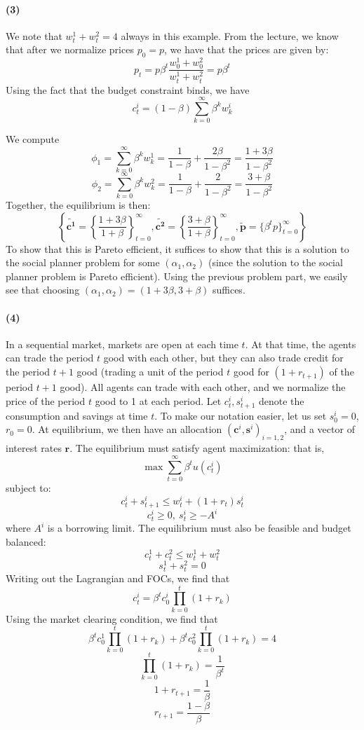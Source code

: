 \documentclass[10pt,letter]{article}
\renewcommand{\vector}[1]{\boldsymbol{#1}}
\newcommand{\problempart}[1]{\paragraph{#1}}
\begin{document}
\problempart{(3)}
We note that $w^1_t + w^2_t = 4$ always in this example. From the lecture, we know that after we normalize prices $p_0 = p$, we have that the prices are given by:
\[ p_t = p\beta^t \frac{w^1_0 + w^2_0}{w^1_t + w^2_t} = p\beta^t \]
Using the fact that the budget constraint binds, we have
\[ c^i_t = (1-\beta)\sum_{k=0}^\infty \beta^k w^i_k \]

We compute
\[ \phi_1 = \sum_{k=0}^\infty \beta^k w^1_k = \frac{1}{1-\beta} + \frac{2\beta }{1-\beta^2} = \frac{1 + 3\beta }{1-\beta^2} \]
\[ \phi_2 = \sum_{k=0}^\infty \beta^k w^2_k = \frac{1}{1-\beta} + \frac{2}{1-\beta^2} = \frac{3 + \beta }{1-\beta^2} \]
Together, the equilibrium is then:
\[ \left\{\vector{\tilde{c^1}} = \left\{\frac{1+3\beta }{1+\beta} \right\}_{t=0}^\infty, \vector{\tilde{c^2}} = \left\{\frac{3+\beta }{1+\beta} \right\}_{t=0}^\infty, \vector{\tilde{p}} =\{ \beta^t p \}_{t=0}^\infty \right\} \]
To show that this is Pareto efficient, it suffices to show that this is a solution to the social planner problem for some $(\alpha_1, \alpha_2)$ (since the solution to the social planner problem is Pareto efficient). Using the previous problem part, we easily see that choosing $(\alpha_1, \alpha_2) = (1+3\beta, 3+\beta)$ suffices.
\problempart{(4)}
In a sequential market, markets are open at each time $t$. At that time, the agents can trade the period $t$ good with each other, but they can also trade credit for the period $t+1$ good (trading a unit of the period $t$ good for $(1+r_{t+1})$ of the period $t+1$ good). All agents can trade with each other, and we normalize the price of the period $t$ good to 1 at each period. Let $c^i_t, s^i_{t+1}$ denote the consumption and savings at time $t$. To make our notation easier, let us set $s^i_0 = 0$, $r_0 = 0$. At equilibrium, we then have an allocation $(\vector{c}^i, \vector{s}^i)_{i=1,2}$, and a vector of interest rates $\vector{r}$. The equilibrium must satisfy agent maximization: that is,
\[ \max \sum_{t=0}^\infty \beta^t u(c^i_t) \]
subject to:
\[ c^i_t + s^i_{t+1} \le w^i_t + (1+r_{t})s^i_t \]
\[ c^i_t \ge 0, \ s^i_t \ge -A^i \]
where $A^i$ is a borrowing limit. The equilibrium must also be feasible and budget balanced:
\[ c^1_t + c^2_t \le w^1_t + w^2_t \]
\[ s^1_t + s^2_t = 0 \]
Writing out the Lagrangian and FOCs, we find that
\[ c^i_t = \beta^t c^i_0 \prod_{k=0}^t (1+ r_k)  \]
Using the market clearing condition, we find that
\[\beta^t c^1_0 \prod_{k=0}^t (1+ r_k) + \beta^t c^2_0 \prod_{k=0}^t (1+ r_k) = 4 \]
\[ \prod_{k=0}^t (1+ r_k) = \frac{1}{\beta^t} \]
\[ 1 + r_{t+1} = \frac{1}{\beta} \]
\[ r_{t+1} = \frac{1-\beta}{\beta} \]
\end{document}
